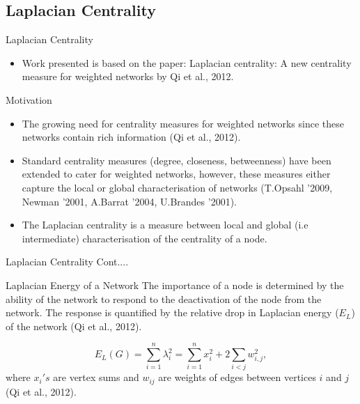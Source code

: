 \documentclass[10pt]{beamer}
\begin{document}
\subsection{Laplacian Centrality}
\begin{frame}{Laplacian Centrality}
	\begin{itemize}
		\item Work presented is based on the paper: Laplacian centrality: A new centrality measure for weighted networks  by Qi et al., 2012.
	\end{itemize}
	\vspace{0.2cm}
	\begin{block}{Motivation}
		\begin{itemize}
			\item The growing need for centrality measures for weighted networks since these networks contain rich information (Qi et al., 2012).
			\vspace{0.2cm}
			\pause
			\item  Standard centrality measures (degree, closeness, betweenness) have been extended to cater for weighted networks, however, these measures either capture the local or global characterisation of networks (T.Opsahl '2009, Newman '2001, A.Barrat '2004, U.Brandes '2001). 
			\vspace{0.2cm}
			\pause
			\item The Laplacian centrality is a measure between local and global (i.e intermediate) characterisation of the centrality of a node.
		\end{itemize}
	\end{block}
\end{frame}

\begin{frame}{Laplacian Centrality Cont....}
	\begin{block}{Laplacian Energy of a Network}
		The importance of a node is determined by the ability of the network to respond to the deactivation  of the node from the network. The response is quantified by the relative drop in Laplacian energy ($E_{L}$) of the network (Qi et al., 2012).
		\vspace{0.4cm}
		
		\begin{equation}
		E_L(G) = \sum_{i=1}^n \lambda_i ^2 = \sum_{i=1}^n x_i^2 + 2 \sum_{i<j} w_{i,j}^2,
		\end{equation}
		where $x_i's$ are vertex sums and $w_{ij}$ are weights of edges between vertices $i$ and $j$ (Qi et al., 2012).
	\end{block}
\end{frame}
\end{document}
